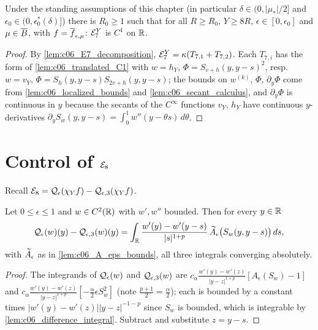 \begin{lemma}[$\mc E_7$ is $C^1$]
  \label{lem:c06_E7_C1}
  Under the standing assumptions of this chapter (in particular $\delta\in(0,|\mu_*|/2]$ and
  $\epsilon_0\in(0,\epsilon_0^*(\delta)]$) there is $R_0\ge1$ such that for all $R\ge R_0$, $Y\ge8R$,
  $\epsilon\in[0,\epsilon_0]$ and $\mu\in\overline{B}$, with $f=\overline{f}_{\epsilon,\mu}$: $\mathcal{E}_7^Y$ is $C^1$ on $\mathbb{R}$.
\end{lemma}
\begin{proof}
  By \cref{lem:c06_E7_decomposition}, $\mathcal{E}_7^Y=\kappa(T_{7,1}+T_{7,2})$. Each $T_{7,i}$ has the form of
  \cref{lem:c06_translated_C1} with $w=h_Y$, $\Phi=S_{v+h}(y,y-s)^2$, resp.\ $w=v_Y$, $\Phi=S_h(y,y-s)S_{2v+h}(y,y-s)$;
  the bounds on $w^{(k)}$, $\Phi$, $\partial_y\Phi$ come from \cref{lem:c06_localized_bounds} and
  \cref{lem:c06_secant_calculus}, and $\partial_y\Phi$ is continuous in $y$ because the secants of the $C^\infty$ functions
  $v_Y$, $h_Y$ have continuous $y$-derivatives $\partial_yS_w(y,y-s)=\int_0^1w''(y-\theta s)\,d\theta$.
\end{proof}

\section{Control of $\mathcal{E}_8$}

Recall $\mathcal{E}_8=\mathcal{Q}_\epsilon(\chi_Yf)-\mathcal{Q}_{\epsilon,3}(\chi_Yf)$.

\begin{lemma}
  \label{lem:c06_quintic_representation}
  Let $0\le\epsilon\le1$ and $w\in C^2(\mathbb{R})$ with $w',w''$ bounded. Then for every $y\in\mathbb{R}$
  \[\mathcal{Q}_\epsilon(w)(y)-\mathcal{Q}_{\epsilon,3}(w)(y)=\int_{\mathbb{R}}\frac{w'(y)-w'(y-s)}{|s|^{1+p}}\,\widetilde{A}_\epsilon\bigl(S_w(y,y-s)\bigr)\,ds,\]
  with $\widetilde{A}_\epsilon$ as in \cref{lem:c06_A_eps_bounds}, all three integrals converging absolutely.
\end{lemma}
\begin{proof}
  The integrands of $\mathcal{Q}_\epsilon(w)$ and $\mathcal{Q}_{\epsilon,3}(w)$ are
  $c_\alpha\frac{w'(y)-w'(z)}{|y-z|^{1+p}}[A_\epsilon(S_w)-1]$ and $c_\alpha\frac{w'(y)-w'(z)}{|y-z|^{1+p}}[-\frac\alpha2\epsilon S_w^2]$
  (note $\frac{p+1}2=\frac\alpha2$); each is bounded by a constant times $|w'(y)-w'(z)||y-z|^{-1-p}$ since $S_w$ is bounded,
  which is integrable by \cref{lem:c06_difference_integral}. Subtract and substitute $z=y-s$.
\end{proof}

